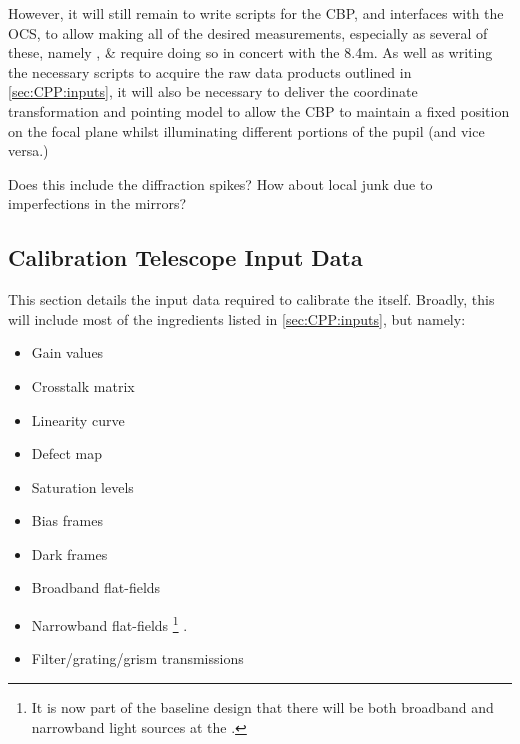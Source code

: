 However, it will still remain to write scripts for the CBP, and interfaces with the OCS, to allow making all of the desired measurements, especially as several of these, namely \xxx, \xxx \& \xxx require doing so in concert with the 8.4m.
\alg As well as writing the necessary scripts to acquire the raw data products outlined in \secsymbol\ref{sec:CPP:inputs}, it will also be necessary to deliver the coordinate transformation and pointing model to allow the CBP to maintain a fixed position on the focal plane whilst illuminating different portions of the pupil (and vice versa.)

\begin{note}
	Does this include the diffraction spikes? How about local junk due to imperfections in the mirrors?
\end{note}


















\subsection{Calibration Telescope Input Data}
\label{sec:CPP:auxTelescope:inputs}
This section details the input data required to calibrate the \auxtelescope itself. Broadly, this will include most of the ingredients listed in \secsymbol\ref{sec:CPP:inputs}, but namely:

\begin{itemize}
	\item Gain values
	\item Crosstalk matrix
	\item Linearity curve
	\item Defect map
	\item Saturation levels
	\item Bias frames
	\item Dark frames
	\item Broadband flat-fields
	\item Narrowband flat-fields \footnote{It is now part of the baseline design that there will be both broadband and narrowband light sources at the \auxtelescope.} .
	\item Filter/grating/grism transmissions
\end{itemize}

